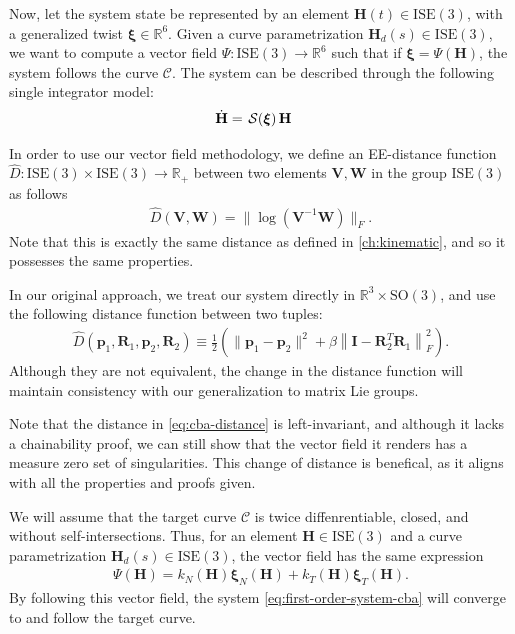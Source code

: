 Now, let the system state be represented by an element $\mathbf{H}(t)\in\text{ISE}(3)$, with a generalized twist $\boldsymbol{\xi}\in\mathbb{R}^6$. Given a curve parametrization $\mathbf{H}_d(s)\in\text{ISE}(3)$, we want to compute a vector field $\Psi:\text{ISE}(3)\to\mathbb{R}^6$ such that if $\boldsymbol{\xi} = \Psi(\mathbf{H})$, the system follows the curve $\mathcal{C}$. The system can be described through the following single integrator model:
\begin{align}
    \dot{\mathbf{H}} &= \SL[\boldsymbol{\xi}]\mathbf{H}\label{eq:first-order-system-cba}
\end{align}

In order to use our vector field methodology, we define an EE-distance function $\widehat{D}: \text{ISE}(3) \times \text{ISE}(3) \to \mathbb{R}_+$ between two elements $\mathbf{V}, \mathbf{W}$ in the group $\text{ISE}(3)$ as follows
\begin{align}
    \widehat{D}(\mathbf{V}, \mathbf{W}) = \| \log(\mathbf{V}^{-1}\mathbf{W}) \|_F. \label{eq:cba-distance-new}
\end{align}
Note that this is exactly the same distance as defined in \cref{ch:kinematic}, and so it possesses the same properties.
\begin{remark}
    In our original approach, we treat our system directly in $\mathbb{R}^3\times\text{SO}(3)$, and use the following distance function between two tuples:
    \begin{align}
        \widehat{D}(\mathbf{p}_1, \mathbf{R}_1, \mathbf{p}_2, \mathbf{R}_2) \equiv \frac{1}{2}\left(\|\mathbf{p}_1 - \mathbf{p}_2\|^2 + \beta\left\|\mathbf{I} - \mathbf{R}_2^{T}\mathbf{R}_1\right\|^2_F\right). \label{eq:cba-distance}
    \end{align}
    Although they are not equivalent, the change in the distance function will maintain consistency with our generalization to matrix Lie groups.
    
    Note that the distance in \eqref{eq:cba-distance} is left-invariant, and although it lacks a chainability proof, we can still show that the vector field it renders has a measure zero set of singularities. This change of distance is benefical, as it aligns with all the properties and proofs given.
\end{remark}

We will assume that the target curve $\mathcal{C}$ is twice diffenrentiable, closed, and without self-intersections. Thus, for an element $\mathbf{H}\in\text{ISE}(3)$ and a curve parametrization $\mathbf{H}_d(s)\in\text{ISE}(3)$, the vector field has the same expression
\begin{align}
    \Psi(\mathbf{H}) = k_N(\mathbf{H})\boldsymbol{\xi}_N(\mathbf{H}) + k_T(\mathbf{H})\boldsymbol{\xi}_T(\mathbf{H}).
\end{align}
By following this vector field, the system \eqref{eq:first-order-system-cba} will converge to and follow the target curve.

